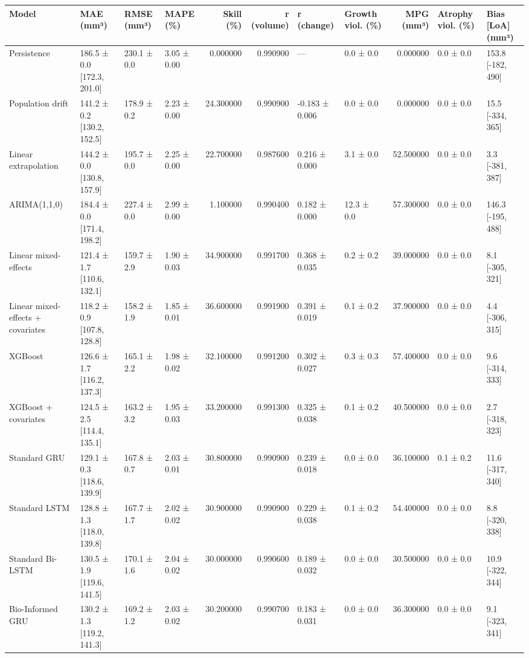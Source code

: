 \begin{tabular}{llllrrllrll}
\toprule
Model & MAE (mm³) & RMSE (mm³) & MAPE (\%) & Skill (\%) & r (volume) & r (change) & Growth viol. (\%) & MPG (mm³) & Atrophy viol. (\%) & Bias [LoA] (mm³) \\
\midrule
Persistence & 186.5 ± 0.0 [172.3, 201.0] & 230.1 ± 0.0 & 3.05 ± 0.00 & 0.000000 & 0.990900 & — & 0.0 ± 0.0 & 0.000000 & 0.0 ± 0.0 & 153.8 [-182, 490] \\
Population drift & 141.2 ± 0.2 [130.2, 152.5] & 178.9 ± 0.2 & 2.23 ± 0.00 & 24.300000 & 0.990900 & -0.183 ± 0.006 & 0.0 ± 0.0 & 0.000000 & 0.0 ± 0.0 & 15.5 [-334, 365] \\
Linear extrapolation & 144.2 ± 0.0 [130.8, 157.9] & 195.7 ± 0.0 & 2.25 ± 0.00 & 22.700000 & 0.987600 & 0.216 ± 0.000 & 3.1 ± 0.0 & 52.500000 & 0.0 ± 0.0 & 3.3 [-381, 387] \\
ARIMA(1,1,0) & 184.4 ± 0.0 [171.4, 198.2] & 227.4 ± 0.0 & 2.99 ± 0.00 & 1.100000 & 0.990400 & 0.182 ± 0.000 & 12.3 ± 0.0 & 57.300000 & 0.0 ± 0.0 & 146.3 [-195, 488] \\
Linear mixed-effects & 121.4 ± 1.7 [110.6, 132.1] & 159.7 ± 2.9 & 1.90 ± 0.03 & 34.900000 & 0.991700 & 0.368 ± 0.035 & 0.2 ± 0.2 & 39.000000 & 0.0 ± 0.0 & 8.1 [-305, 321] \\
Linear mixed-effects + covariates & 118.2 ± 0.9 [107.8, 128.8] & 158.2 ± 1.9 & 1.85 ± 0.01 & 36.600000 & 0.991900 & 0.391 ± 0.019 & 0.1 ± 0.2 & 37.900000 & 0.0 ± 0.0 & 4.4 [-306, 315] \\
XGBoost & 126.6 ± 1.7 [116.2, 137.3] & 165.1 ± 2.2 & 1.98 ± 0.02 & 32.100000 & 0.991200 & 0.302 ± 0.027 & 0.3 ± 0.3 & 57.400000 & 0.0 ± 0.0 & 9.6 [-314, 333] \\
XGBoost + covariates & 124.5 ± 2.5 [114.4, 135.1] & 163.2 ± 3.2 & 1.95 ± 0.03 & 33.200000 & 0.991300 & 0.325 ± 0.038 & 0.1 ± 0.2 & 40.500000 & 0.0 ± 0.0 & 2.7 [-318, 323] \\
Standard GRU & 129.1 ± 0.3 [118.6, 139.9] & 167.8 ± 0.7 & 2.03 ± 0.01 & 30.800000 & 0.990900 & 0.239 ± 0.018 & 0.0 ± 0.0 & 36.100000 & 0.1 ± 0.2 & 11.6 [-317, 340] \\
Standard LSTM & 128.8 ± 1.3 [118.0, 139.8] & 167.7 ± 1.7 & 2.02 ± 0.02 & 30.900000 & 0.990900 & 0.229 ± 0.038 & 0.1 ± 0.2 & 54.400000 & 0.0 ± 0.0 & 8.8 [-320, 338] \\
Standard Bi-LSTM & 130.5 ± 1.9 [119.6, 141.5] & 170.1 ± 1.6 & 2.04 ± 0.02 & 30.000000 & 0.990600 & 0.189 ± 0.032 & 0.0 ± 0.0 & 30.500000 & 0.0 ± 0.0 & 10.9 [-322, 344] \\
Bio-Informed GRU & 130.2 ± 1.3 [119.2, 141.3] & 169.2 ± 1.2 & 2.03 ± 0.02 & 30.200000 & 0.990700 & 0.183 ± 0.031 & 0.0 ± 0.0 & 36.300000 & 0.0 ± 0.0 & 9.1 [-323, 341] \\

\end{tabular}

